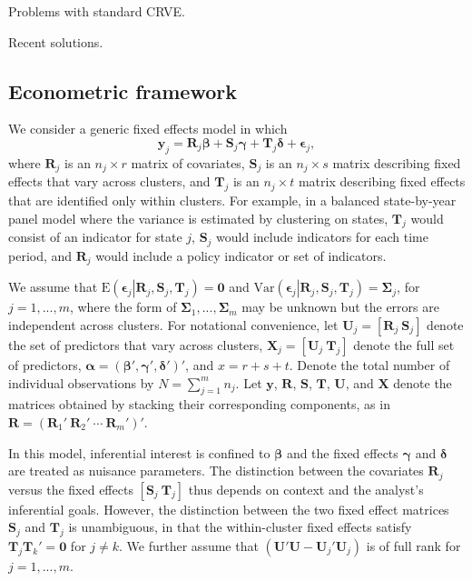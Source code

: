 \documentclass[12pt]{article}\usepackage[]{graphicx}\usepackage[]{color}
\newcommand{\E}{\text{E}}
\newcommand{\Var}{\text{Var}}
\newcommand{\bm}{\mathbf}
\newcommand{\bs}{\boldsymbol}
\begin{document}
Problems with standard CRVE.

Recent solutions. 

\subsection{Econometric framework}

We consider a generic fixed effects model in which
\begin{equation}
\label{eq:fixed_effects}
\bm{y}_j = \bm{R}_j \bs\beta + \bm{S}_j \bs\gamma + \bm{T}_j \bs\delta + \bs\epsilon_j,
\end{equation}
where $\bm{R}_j$ is an $n_j \times r$ matrix of covariates, $\bm{S}_j$ is an $n_j \times s$ matrix describing fixed effects that vary across clusters, and $\bm{T}_j$ is an $n_j \times t$ matrix describing fixed effects that are identified only within clusters. For example, in a balanced state-by-year panel model where the variance is estimated by clustering on states, $\bm{T}_j$ would consist of an indicator for state $j$, $\bm{S}_j$ would include indicators for each time period, and $\bm{R}_j$ would include a policy indicator or set of indicators.

We assume that $\E\left(\bs\epsilon_j\left|\bm{R}_j,\bm{S}_j, \bm{T}_j\right.\right) = \bm{0}$ and $\Var\left(\bs\epsilon_j\left|\bm{R}_j,\bm{S}_j,\bm{T}_j\right.\right) = \bs\Sigma_j$, for $j = 1,...,m$, where the form of $\bs\Sigma_1,...,\bs\Sigma_m$ may be unknown but the errors are independent across clusters. 
For notational convenience, let $\bm{U}_j = \left[\bm{R}_j \ \bm{S}_j \right]$ denote the set of predictors that vary across clusters, $\bm{X}_j = \left[\bm{U}_j \ \bm{T}_j \right]$ denote the full set of predictors, $\bs\alpha = \left(\bs\beta', \bs\gamma', \bs\delta' \right)'$, and $x = r + s + t$.
Denote the total number of individual observations by $N = \sum_{j=1}^m n_j$.
Let $\bm{y}$, $\bm{R}$, $\bm{S}$, $\bm{T}$, $\bm{U}$, and $\bm{X}$ denote the matrices obtained by stacking their corresponding components, as in $\bm{R} = \left(\bm{R}_1' \ \bm{R}_2' \ \cdots \ \bm{R}_m'\right)'$. 

In this model, inferential interest is confined to $\bs\beta$ and the fixed effects $\bs\gamma$ and $\bs\delta$ are treated as nuisance parameters. The distinction between the covariates $\bm{R}_j$ versus the fixed effects $\left[\bm{S}_j \ \bm{T}_j\right]$ thus depends on context and the analyst's inferential goals. However, the distinction between the two fixed effect matrices $\bm{S}_j$ and $\bm{T}_j$ is unambiguous, in that the within-cluster fixed effects satisfy $\bm{T}_j \bm{T}_k' = \bm{0}$ for $j \neq k$. We further assume that $\left(\bm{U}'\bm{U} - \bm{U}_j'\bm{U}_j\right)$ is of full rank for $j = 1,...,m$.
\end{document}
